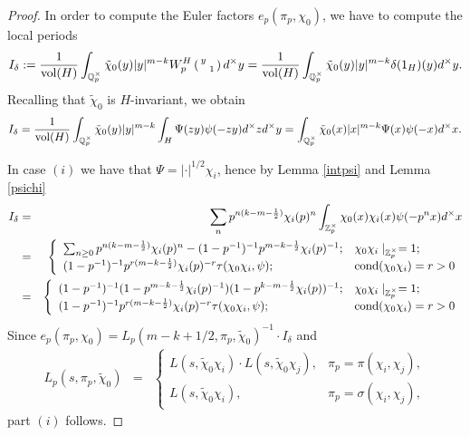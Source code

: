 \documentclass{amsart}
\newcommand{\Z}{{\mathbb Z}}
\newcommand{\Q}{{\mathbb Q}}
\begin{document}
\begin{proof}
In order to compute the Euler factors $e_p(\pi_p,\chi_0)$, we have to compute the local periods
\[
I_\delta:=\frac{1}{{\rm vol}(H)}\int_{\Q_p^\times}\tilde\chi_0(y)|y|^{m-k}W_p^H\left(\begin{smallmatrix}y&\\&1\end{smallmatrix}\right)d^\times y=\frac{1}{{\rm vol}(H)}\int_{\Q_p^\times}\tilde\chi_0(y)|y|^{m-k}\delta(1_H)(y)d^\times y.
\]
Recalling that $\tilde\chi_0$ is $H$-invariant, we obtain
\[
I_\delta=\frac{1}{{\rm vol}(H)}\int_{\Q_p^\times}\tilde\chi_0(y)|y|^{m-k}\int_{H}\Psi(zy)\psi(-zy)d^\times zd^\times y=\int_{\Q_p^\times}\tilde\chi_0(x)|x|^{m-k}\Psi(x)\psi(-x)d^\times x.
\]


In case $(i)$ we have that $\Psi=|\cdot|^{1/2}\chi_i$,
hence by Lemma \ref{intpsi} and Lemma \ref{psichi}
\begin{eqnarray*}
I_\delta&=&\sum_np^{n(k-m-\frac{1}{2})}\chi_i(p)^n\int_{\Z_p^\times}\chi_0(x)\chi_i(x)\psi(-p^nx)d^\times x\\
&=&\left\{\begin{array}{ll}
\sum_{n\geq0}p^{n(k-m-\frac{1}{2})}\chi_i(p)^n-(1-p^{-1})^{-1}p^{m-k-\frac{1}{2}}\chi_i(p)^{-1};&\chi_0\chi_i\mid_{\Z_p^\times}=1;\\
(1-p^{-1})^{-1}p^{r(m-k-\frac{1}{2})}\chi_i(p)^{-r}\tau(\chi_0\chi_i,\psi);&{\rm cond}(\chi_0\chi_i)=r>0
\end{array}\right.\\
&=&\left\{\begin{array}{ll}
(1-p^{-1})^{-1}(1-p^{m-k-\frac{1}{2}}\chi_i(p)^{-1})(1-p^{k-m-\frac{1}{2}}\chi_i(p))^{-1};&\chi_0\chi_i\mid_{\Z_p^\times}=1;\\
(1-p^{-1})^{-1}p^{r(m-k-\frac{1}{2})}\chi_i(p)^{-r}\tau(\chi_0\chi_i,\psi);&{\rm cond}(\chi_0\chi_i)=r>0
\end{array}\right.
\end{eqnarray*}
Since $e_p(\pi_p,\chi_0)=L_p(m-k+1/2,\pi_p,\tilde\chi_0)^{-1}\cdot I_\delta$ and 
\begin{eqnarray*}
L_p(s,\pi_p,\tilde\chi_0)&=&\left\{\begin{array}{lc}L(s,\tilde\chi_0\chi_i)\cdot L(s,\tilde\chi_0\chi_j),&\pi_p=\pi(\chi_i,\chi_j),\\
L(s,\tilde\chi_0\chi_i),&\pi_p=\sigma(\chi_i,\chi_j),\end{array}\right.
\end{eqnarray*}
part $(i)$ follows.




\end{proof}
\end{document}
